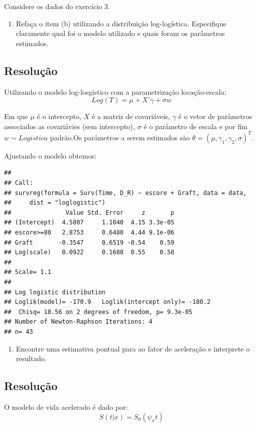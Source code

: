 \documentclass[]{article}
\providecommand{\tightlist}{%
  \setlength{\itemsep}{0pt}\setlength{\parskip}{0pt}}
\begin{document}
Considere os dados do exercício 3.

\begin{enumerate}
\def\labelenumi{(\alph{enumi})}
\tightlist
\item
  Refaça o item (b) utilizando a distribuição log-logística. Especifique
  claramente qual foi o modelo utilizado e quais foram os parâmetros
  estimados.
\end{enumerate}

\subsection{Resolução}\label{resolucao-9}

Utilizando o modelo log-losgistico com a parametrização locação-escala:
\[Log(T)=\mu +X'\gamma+ \sigma w\]

Em que \(\mu\) é o intercepto, \(X\) é a matriz de covariáveis,
\(\gamma\) é o vetor de parâmetros associados as covariávies (sem
intercepto), \(\sigma\) é o parâmetro de escala e por fim
\(w \sim Logistica\) padrão.Os parâmetros a serem estimados são
\(\theta=(\mu,\gamma_1,\gamma_2,\sigma)^T\).

Ajustando o modelo obtemos:

\begin{verbatim}
## 
## Call:
## survreg(formula = Surv(Time, D_R) ~ escore + Graft, data = data, 
##     dist = "loglogistic")
##               Value Std. Error     z       p
## (Intercept)  4.5807     1.1040  4.15 3.3e-05
## escore>=80   2.8753     0.6480  4.44 9.1e-06
## Graft       -0.3547     0.6519 -0.54    0.59
## Log(scale)   0.0922     0.1688  0.55    0.58
## 
## Scale= 1.1 
## 
## Log logistic distribution
## Loglik(model)= -170.9   Loglik(intercept only)= -180.2
##  Chisq= 18.56 on 2 degrees of freedom, p= 9.3e-05 
## Number of Newton-Raphson Iterations: 4 
## n= 43
\end{verbatim}

\begin{enumerate}
\def\labelenumi{(\alph{enumi})}
\setcounter{enumi}{1}
\tightlist
\item
  Encontre uma estimativa pontual para ao fator de aceleração e
  interprete o resultado.
\end{enumerate}

\subsection{Resolução}\label{resolucao-10}

O modelo de vida acelerado é dado por: \[S(t|x)=S_0(\psi_xt)\]
\end{document}
